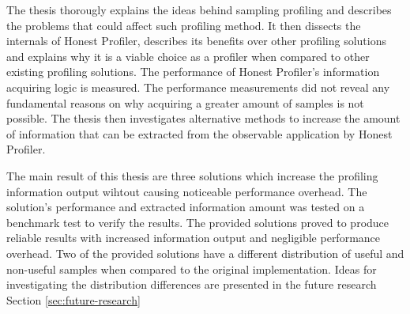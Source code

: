 \documentclass[..thesis.tex]{subfiles}
\begin{document}
The thesis thorougly explains the ideas behind sampling profiling and describes the problems that could affect such profiling method. It then dissects the internals of Honest Profiler, describes its benefits over other profiling solutions and explains why it is a viable choice as a profiler when compared to other existing profiling solutions. The performance of Honest Profiler's information acquiring logic is measured. The performance measurements did not reveal any fundamental reasons on why acquiring a greater amount of samples is not possible. The thesis then investigates alternative methods to increase the amount of information that can be extracted from the observable application by Honest Profiler.

The main result of this thesis are three solutions which increase the profiling information output wihtout causing noticeable performance overhead. The solution's performance and extracted information amount was tested on a benchmark test to verify the results. The provided solutions proved to produce reliable results with increased information output and negligible performance overhead. Two of the provided solutions have a different distribution of useful and non-useful samples when compared to the original implementation. Ideas for investigating the distribution differences are presented in the future research Section \ref{sec:future-research}

\end{document}
